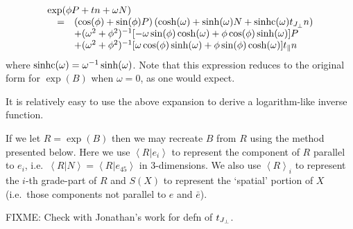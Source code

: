 \[
\begin{array}{rl}
\multicolumn{2}{l}{\exp(\phi P + tn + \omega N)}\\
\quad = & \left(\cos(\phi) + \sin(\phi)P\right)\left(\cosh(\omega) +
		\sinh(\omega)N + \sinhc(\omega)t_\Jperp n\right)\\
&+ (\omega^2 + \phi^2)^{-1} [-\omega\sin(\phi)\cosh(\omega)+\phi\cos(\phi)\sinh(\omega)]P\\
&+ (\omega^2 + \phi^2)^{-1} [\omega\cos (\phi)\sinh (\omega) + \phi \sin(\phi)\cosh(\omega)] t_\parallel n \\
	\end{array}
\]
where $\mathrm{sinhc}(\omega) = \omega^{-1}\sinh(\omega)$. Note that this expression reduces to 
the original form for $\exp(B)$ when $\omega = 0$, as one would expect.

It is relatively easy to use the above expansion to derive a logarithm-like inverse 
function. 

If we let $R = \exp(B)$ then we may recreate $B$ from $R$ using the method 
presented
below. Here we use $\left<R|e_i\right>$ to represent the component of $R$
parallel to $e_i$, i.e.\ $\left<R|N\right> = \left<R|e_{45}\right>$ in 
3-dimensions. We also use $\left<R\right>_i$ to represent the 
$i$-th grade-part of $R$ and $S(X)$ to represent the 
`spatial' portion of $X$ (i.e.\ those components not parallel to $e$ and 
$\bar{e}$).

FIXME: Check with Jonathan's work for defn of $t_{J_\perp}$.

